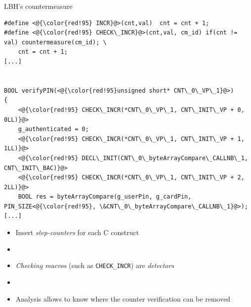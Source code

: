 \begin{frame}{LBH's countermeasure \cite{Lalande/ESORICS14}} 
    \vspace{0.3cm}
    
    \lstset{style=customc}
    \begin{lstlisting}
#define <@{\color{red!95} INCR}@>(cnt,val)  cnt = cnt + 1;
#define <@{\color{red!95} CHECK\_INCR}@>(cnt,val, cm_id) if(cnt != val) countermeasure(cm_id); \
    cnt = cnt + 1;
[...]
        
        
BOOL verifyPIN(<@{\color{red!95}unsigned short* CNT\_0\_VP\_1}@>) 
{
    <@{\color{red!95} CHECK\_INCR(*CNT\_0\_VP\_1, CNT\_INIT\_VP + 0, 0LL)}@>
    g_authenticated = 0;
    <@{\color{red!95} CHECK\_INCR(*CNT\_0\_VP\_1, CNT\_INIT\_VP + 1, 1LL)}@>
    <@{\color{red!95} DECL\_INIT(CNT\_0\_byteArrayCompare\_CALLNB\_1, CNT\_INIT\_BAC)}@>
    <@{\color{red!95} CHECK\_INCR(*CNT\_0\_VP\_1, CNT\_INIT\_VP + 2, 2LL)}@>
    BOOL res = byteArrayCompare(g_userPin, g_cardPin, PIN_SIZE<@{\color{red!95}, \&CNT\_0\_byteArrayCompare\_CALLNB\_1}@>);
[...]
    \end{lstlisting}

    \begin{itemize}
        \item Insert \textit{step-counters} for each C construct
        \item[]
        \item \textit{Checking macros} (such as \lstinline{CHECK_INCR}) are \emph{detectors}
        \item[]
        \item Analysis allows to know where the counter verification can be removed
    \end{itemize}
    \vfill
\end{frame}